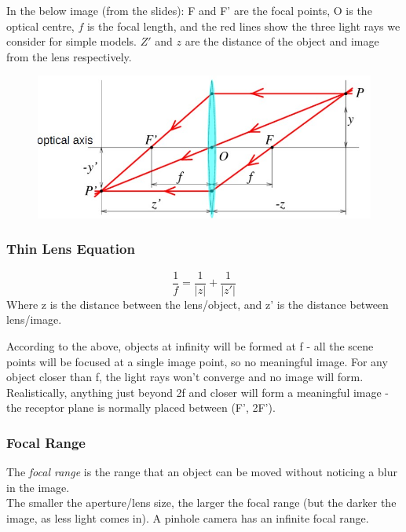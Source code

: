 In the below image (from the slides): F and F' are the focal points, O is the optical centre, $f$ is the focal length, and the red lines show the three light rays we consider for simple models.  $Z'$ and $z$ are the distance of the object and image from the lens respectively. 
\begin{figure}[H]
    \centering
    \includegraphics[width = \textwidth]{Images/Thin_Lens_Diagram}
\end{figure}

\subsubsection{Thin Lens Equation}
\begin{equation}
    \frac{1}{f} = \frac{1}{|z|} + \frac{1}{|z'|}
\end{equation}
Where z is the distance between the lens/object, and z' is the distance between lens/image. 

According to the above, objects at infinity will be formed at f - all the scene points will be focused at a single image point, so no meaningful image. For any object closer than f, the light rays won't converge and no image will form. Realistically, anything just beyond 2f and closer will form a meaningful image - the receptor plane is normally placed between (F', 2F'). 

\subsubsection{Focal Range}
The \emph{focal range} is the range that an object can be moved without noticing a blur in the image.\\ The smaller the aperture/lens size, the larger the focal range (but the darker the image, as less light comes in). A pinhole camera has an infinite focal range. 

